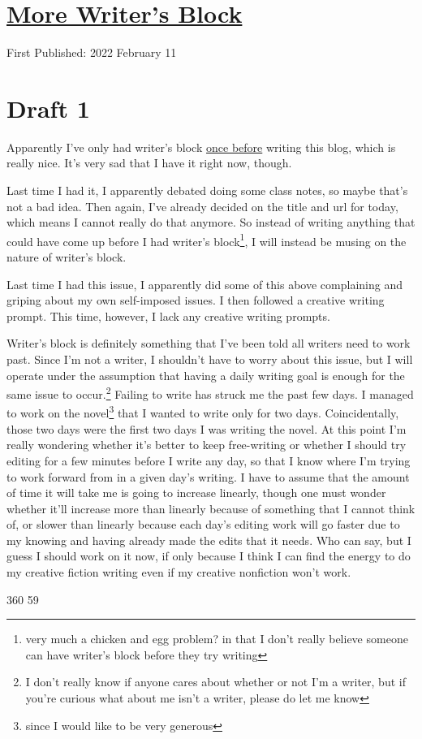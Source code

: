 \documentclass[12pt]{article}[titlepage]
\newcommand{\1}{\={a}}
\newcommand{\2}{\={e}}
\newcommand{\3}{\={\i}}
\newcommand{\4}{\=o}
\newcommand{\5}{\=u}
\newcommand{\6}{\={A}}
\renewcommand{\,}{\textsuperscript{,}}
\begin{document}
\doublespacing
\section{\href{writers-block-2.html}{More Writer's Block}}
First Published: 2022 February 11

\section{Draft 1}
Apparently I've only had writer's block \href{writers-block.html}{once before} writing this blog, which is really nice.
It's very sad that I have it right now, though.

Last time I had it, I apparently debated doing some class notes, so maybe that's not a bad idea.
Then again, I've already decided on the title and url for today, which means I cannot really do that anymore.
So instead of writing anything that could have come up before I had writer's block\footnote{very much a chicken and egg problem? in that I don't really believe someone can have writer's block before they try writing}, I will instead be musing on the nature of writer's block.

Last time I had this issue, I apparently did some of this above complaining and griping about my own self-imposed issues.
I then followed a creative writing prompt.
This time, however, I lack any creative writing prompts.

Writer's block is definitely something that I've been told all writers need to work past.
Since I'm not a writer, I shouldn't have to worry about this issue, but I will operate under the assumption that having a daily writing goal is enough for the same issue to occur.\footnote{I don't really know if anyone cares about whether or not I'm a writer, but if you're curious what about me isn't a writer, please do let me know}
Failing to write has struck me the past few days.
I managed to work on the novel\footnote{since I would like to be very generous} that I wanted to write only for two days.
Coincidentally, those two days were the first two days I was writing the novel.
At this point I'm really wondering whether it's better to keep free-writing or whether I should try editing for a few minutes before I write any day, so that I know where I'm trying to work forward from in a given day's writing.
I have to assume that the amount of time it will take me is going to increase linearly, though one must wonder whether it'll increase more than linearly because of something that I cannot think of, or slower than linearly because each day's editing work will go faster due to my knowing and having already made the edits that it needs.
Who can say, but I guess I should work on it now, if only because I think I can find the energy to do my creative fiction writing even if my creative nonfiction won't work.

360
59
\end{document}
